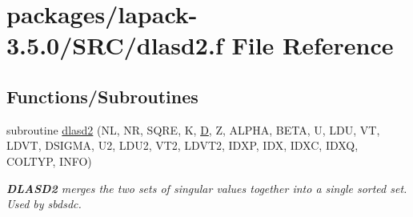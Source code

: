 \hypertarget{dlasd2_8f}{}\section{packages/lapack-\/3.5.0/\+S\+R\+C/dlasd2.f File Reference}
\label{dlasd2_8f}
\subsection*{Functions/\+Subroutines}
\begin{DoxyCompactItemize}
\item 
subroutine \hyperlink{group__auxOTHERauxiliary_ga32db876aadda88c12c75db105fe4f21c}{dlasd2} (N\+L, N\+R, S\+Q\+R\+E, K, \hyperlink{odrpack_8h_a7dae6ea403d00f3687f24a874e67d139}{D}, Z, A\+L\+P\+H\+A, B\+E\+T\+A, U, L\+D\+U, V\+T, L\+D\+V\+T, D\+S\+I\+G\+M\+A, U2, L\+D\+U2, V\+T2, L\+D\+V\+T2, I\+D\+X\+P, I\+D\+X, I\+D\+X\+C, I\+D\+X\+Q, C\+O\+L\+T\+Y\+P, I\+N\+F\+O)
\begin{DoxyCompactList}\small\item\em {\bfseries D\+L\+A\+S\+D2} merges the two sets of singular values together into a single sorted set. Used by sbdsdc. \end{DoxyCompactList}\end{DoxyCompactItemize}
